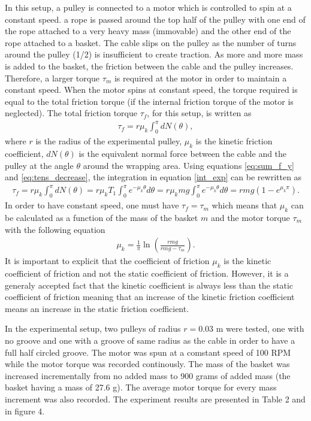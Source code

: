 \documentclass[10pt,cleanfoot]{asme2ej}
\begin{document}
In this setup, a pulley is connected to a motor which is controlled to spin at a constant speed. a rope is passed around the top half of the pulley with one end of the rope attached to a very heavy mass (immovable) and the other end of the rope attached to a basket. The cable slips on the pulley as the number of turns around the pulley (1/2) is insufficient to create traction. As more and more mass is added to the basket, the friction between the cable and the pulley increases. Therefore, a larger torque $\tau_m$ is required at the motor in order to maintain a constant speed. When the motor spins at constant speed, the torque required is equal to the total friction torque (if the internal friction torque of the motor is neglected). The total friction torque $\tau_f$, for this setup, is written as 
\begin{align}
\tau_f = r\mu_k\int_0^\pi dN(\theta),
\label{int_exp}
\end{align}where $r$ is the radius of the experimental pulley, $\mu_k$ is the kinetic friction coefficient, $dN(\theta)$ is the equivalent normal force between the cable and the pulley at the angle $\theta$ around the wrapping area. Using equations \eqref{eq:sum_f_y} and \eqref{eq:tens_decrease}, the integration in equation \eqref{int_exp} can be rewritten as 
\begin{align}
\tau_f = r\mu_k\int_0^\pi dN(\theta) = r\mu_kT_1\int_0^\pi e^{-\mu_k\theta}d\theta = r\mu_kmg\int_0^\pi e^{-\mu_k\theta}d\theta = rmg\left(1-e^{\mu_k\pi}\right).
\end{align}
In order to have constant speed, one must have $\tau_f = \tau_m$ which means that $\mu_k$ can be calculated as a function of the mass of the basket $m$ and the motor torque $\tau_m$ with the following equation
\begin{align}
\mu_k = \frac{1}{\pi}\ln\left({\frac{rmg}{rmg-\tau_m}}\right).
\end{align}
It is important to explicit that the coefficient of friction $\mu_k$ is the kinetic coefficient of friction and not the static coefficient of friction. However, it is a generaly accepted fact that the kinetic coefficient is always less than the static coefficient of friction meaning that an increase of the kinetic friction coefficient means an increase in the static friction coefficient. 
\par 
In the experimental setup, two pulleys of radius $r=0.03$ m were tested, one with no groove and one with a groove of same radius as the cable in order to have a full half circled groove. The motor was spun at a comstant speed of 100 RPM while the motor torque was recorded continously. The mass of the basket was increased incrementally from no added mass to 900 grams of added mass (the basket having a mass of 27.6 g). The average motor torque for every mass increment was also recorded. The experiment results are presented in Table 2 and in figure 4.
\end{document}
